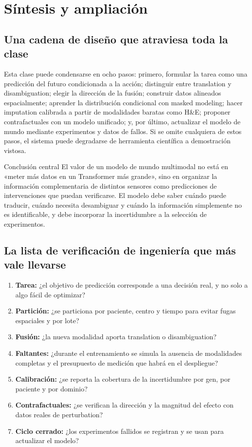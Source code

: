 \section{Síntesis y ampliación}

\subsection{Una cadena de diseño que atraviesa toda la clase}

Esta clase puede condensarse en ocho pasos: primero, formular la tarea como una predicción del futuro condicionada a la acción; distinguir entre translation y disambiguation; elegir la dirección de la fusión; construir datos alineados espacialmente; aprender la distribución condicional con masked modeling; hacer imputation calibrada a partir de modalidades baratas como H\&E; proponer contrafactuales con un modelo unificado; y, por último, actualizar el modelo de mundo mediante experimentos y datos de fallos. Si se omite cualquiera de estos pasos, el sistema puede degradarse de herramienta científica a demostración vistosa.

\begin{importantbox}{Conclusión central}
El valor de un modelo de mundo multimodal no está en «meter más datos en un Transformer más grande», sino en organizar la información complementaria de distintos sensores como predicciones de intervenciones que puedan verificarse. El modelo debe saber cuándo puede traducir, cuándo necesita desambiguar y cuándo la información simplemente no es identificable, y debe incorporar la incertidumbre a la selección de experimentos.
\end{importantbox}

\subsection{La lista de verificación de ingeniería que más vale llevarse}

\begin{enumerate}
  \item \textbf{Tarea:} ¿el objetivo de predicción corresponde a una decisión real, y no solo a algo fácil de optimizar?
  \item \textbf{Partición:} ¿se particiona por paciente, centro y tiempo para evitar fugas espaciales y por lote?
  \item \textbf{Fusión:} ¿la nueva modalidad aporta translation o disambiguation?
  \item \textbf{Faltantes:} ¿durante el entrenamiento se simula la ausencia de modalidades completas y el presupuesto de medición que habrá en el despliegue?
  \item \textbf{Calibración:} ¿se reporta la cobertura de la incertidumbre por gen, por paciente y por dominio?
  \item \textbf{Contrafactuales:} ¿se verifican la dirección y la magnitud del efecto con datos reales de perturbation?
  \item \textbf{Ciclo cerrado:} ¿los experimentos fallidos se registran y se usan para actualizar el modelo?
\end{enumerate}

